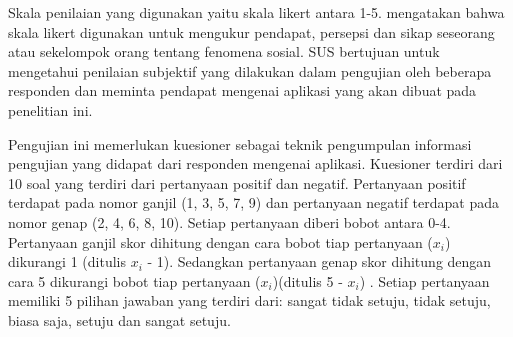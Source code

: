 \par Skala penilaian yang digunakan yaitu skala likert antara 1-5. \cite{Sugiyono2004} mengatakan bahwa skala likert digunakan untuk mengukur pendapat, persepsi dan sikap seseorang atau sekelompok orang tentang fenomena sosial. SUS bertujuan untuk mengetahui penilaian subjektif yang dilakukan dalam pengujian oleh beberapa responden dan meminta pendapat mengenai aplikasi yang akan dibuat pada penelitian ini.
\par Pengujian ini memerlukan kuesioner sebagai teknik pengumpulan informasi pengujian yang didapat dari responden mengenai aplikasi. Kuesioner terdiri dari 10 soal yang terdiri dari pertanyaan positif dan negatif. Pertanyaan positif terdapat pada nomor ganjil (1, 3, 5, 7, 9) dan pertanyaan negatif terdapat pada nomor genap (2, 4, 6, 8, 10). Setiap pertanyaan diberi bobot antara 0-4. Pertanyaan ganjil skor dihitung dengan cara bobot tiap pertanyaan ($x_{i}$) dikurangi 1 (ditulis $x_{i}$ - 1). Sedangkan pertanyaan genap skor dihitung dengan cara 5 dikurangi bobot tiap pertanyaan ($x_{i}$)(ditulis 5 - $x_{i}$) \citep{Ardiansyah2016}. Setiap pertanyaan memiliki 5 pilihan jawaban yang terdiri dari: sangat tidak setuju, tidak setuju, biasa saja, setuju dan sangat setuju.


